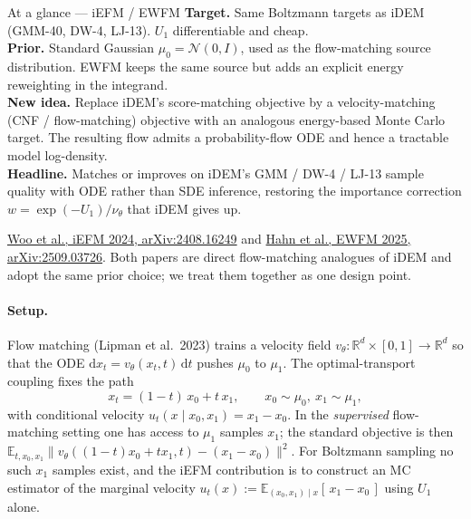 \documentclass[11pt,letterpaper]{article}
\newcommand{\E}{\mathbb{E}}
\newcommand{\Real}{\mathbb{R}}
\newcommand{\dd}{\mathrm{d}}
\theoremstyle{plain}
\begin{document}
\begin{methodbox}{At a glance --- iEFM / EWFM}
\textbf{Target.} Same Boltzmann targets as iDEM (GMM-40, DW-4, LJ-13). $U_1$
differentiable and cheap.\\
\textbf{Prior.} Standard Gaussian $\mu_0=\mathcal N(0,I)$, used as the
flow-matching source distribution. EWFM keeps the same source but adds an
explicit energy reweighting in the integrand.\\
\textbf{New idea.} Replace iDEM's score-matching objective by a
velocity-matching (CNF / flow-matching) objective with an analogous
energy-based Monte Carlo target. The resulting flow admits a probability-flow
ODE and hence a tractable model log-density.\\
\textbf{Headline.} Matches or improves on iDEM's GMM / DW-4 / LJ-13 sample
quality with ODE rather than SDE inference, restoring the importance
correction $w=\exp(-U_1)/\nu_\theta$ that iDEM gives up.
\end{methodbox}

\href{https://arxiv.org/abs/2408.16249}{Woo et al., iEFM 2024,
arXiv:2408.16249} and \href{https://arxiv.org/abs/2509.03726}{Hahn et al.,
EWFM 2025, arXiv:2509.03726}. Both papers are direct flow-matching analogues
of iDEM and adopt the same prior choice; we treat them together as one
design point.

\paragraph{Setup.} Flow matching (Lipman et al.\ 2023) trains a velocity
field $v_\theta:\Real^d\times[0,1]\to\Real^d$ so that the ODE
$\dd x_t = v_\theta(x_t,t)\,\dd t$ pushes $\mu_0$ to $\mu_1$. The
optimal-transport coupling fixes the path
\begin{equation}
  x_t = (1-t)\,x_0 + t\,x_1,\qquad x_0\sim\mu_0,\ x_1\sim\mu_1,
  \label{eq:iefm-path}
\end{equation}
with conditional velocity $u_t(x\mid x_0,x_1) = x_1 - x_0$. In the
\emph{supervised} flow-matching setting one has access to $\mu_1$ samples
$x_1$; the standard objective is then
$\E_{t,x_0,x_1}\|v_\theta((1-t)x_0+tx_1,t) - (x_1-x_0)\|^2$. For Boltzmann
sampling no such $x_1$ samples exist, and the iEFM contribution is to
construct an MC estimator of the marginal velocity
$u_t(x) := \E_{(x_0,x_1)\mid x}[\,x_1-x_0\,]$ using $U_1$ alone.
\end{document}
